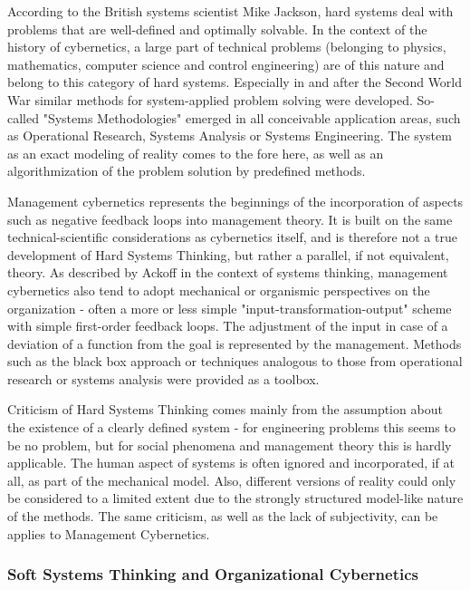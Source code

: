 \documentclass[a4paper,12pt]{scrartcl}
\begin{document}
According to the British systems scientist Mike Jackson, hard systems deal with problems that are well-defined and optimally solvable. In the context of the history of cybernetics, a large part of technical problems (belonging to physics, mathematics, computer science and control engineering) are of this nature and belong to this category of hard systems.
Especially in and after the Second World War similar methods for system-applied problem solving were developed. So-called "Systems Methodologies" emerged in all conceivable application areas, such as Operational Research, Systems Analysis or Systems Engineering.
The system as an exact modeling of reality comes to the fore here, as well as an algorithmization of the problem solution by predefined methods.\cite{jackson:2003}

Management cybernetics represents the beginnings of the incorporation of aspects such as negative feedback loops into management theory. It is built on the same technical-scientific considerations as cybernetics itself, and is therefore not a true development of Hard Systems Thinking, but rather a parallel, if not equivalent, theory. As described by Ackoff in the context of systems thinking, management cybernetics also tend to adopt mechanical or organismic perspectives on the organization - often a more or less simple "input-transformation-output" scheme with simple first-order feedback loops. The adjustment of the input in case of a deviation of a function from the goal is represented by the management. Methods such as the black box approach or techniques analogous to those from operational research or systems analysis were provided as a toolbox.\cite{jackson:1991}

Criticism of Hard Systems Thinking comes mainly from the assumption about the existence of a clearly defined system - for engineering problems this seems to be no problem, but for social phenomena and management theory this is hardly applicable. The human aspect of systems is often ignored and incorporated, if at all, as part of the mechanical model. 
Also, different versions of reality could only be considered to a limited extent due to the strongly structured model-like nature of the methods. The same criticism, as well as the lack of subjectivity, can be applies to Management Cybernetics.\cite{jackson:1991}

\subsubsection{Soft Systems Thinking  and Organizational Cybernetics}
\end{document}
